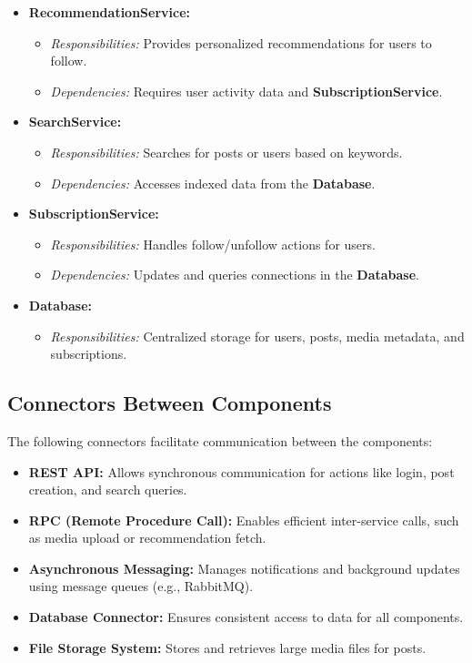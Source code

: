 \documentclass[a4paper,12pt]{article}
\begin{document}
\begin{itemize}
    \item \textbf{RecommendationService:}
    \begin{itemize}
        \item \textit{Responsibilities:} Provides personalized recommendations for users to follow.
        \item \textit{Dependencies:} Requires user activity data and \textbf{SubscriptionService}.
    \end{itemize}

    \item \textbf{SearchService:}
    \begin{itemize}
        \item \textit{Responsibilities:} Searches for posts or users based on keywords.
        \item \textit{Dependencies:} Accesses indexed data from the \textbf{Database}.
    \end{itemize}

    \item \textbf{SubscriptionService:}
    \begin{itemize}
        \item \textit{Responsibilities:} Handles follow/unfollow actions for users.
        \item \textit{Dependencies:} Updates and queries connections in the \textbf{Database}.
    \end{itemize}

    \item \textbf{Database:}
    \begin{itemize}
        \item \textit{Responsibilities:} Centralized storage for users, posts, media metadata, and subscriptions.
    \end{itemize}
\end{itemize}

\subsection{Connectors Between Components}

The following connectors facilitate communication between the components:

\begin{itemize}
    \item \textbf{REST API:} Allows synchronous communication for actions like login, post creation, and search queries.
    \item \textbf{RPC (Remote Procedure Call):} Enables efficient inter-service calls, such as media upload or recommendation fetch.
    \item \textbf{Asynchronous Messaging:} Manages notifications and background updates using message queues (e.g., RabbitMQ).
    \item \textbf{Database Connector:} Ensures consistent access to data for all components.
    \item \textbf{File Storage System:} Stores and retrieves large media files for posts.
\end{itemize}
\end{document}
